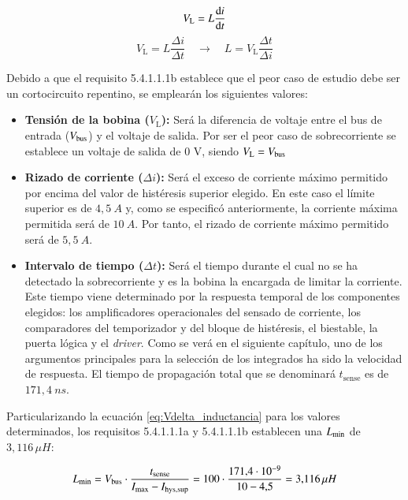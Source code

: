 \documentclass[12pt]{report} %
\begin{document}
\begin{equation}
    \label{eq:Vderivada_inductancia}
   V_\text{L} = L \dv{i}{t}
\end{equation}
\begin{equation}
    V_\text{L} = L \frac{\Delta i}{\Delta t} \quad \longrightarrow \quad L = V_\text{L}\frac{\Delta t}{\Delta i}
    \label{eq:Vdelta_inductancia}
\end{equation}

Debido a que el requisito 5.4.1.1.1b establece que el peor caso de estudio debe ser un cortocircuito repentino, se emplearán los siguientes valores:

\begin{itemize}
    \item \textbf{Tensión de la bobina ($V_\text{L}$):} Será la diferencia de voltaje entre el bus de entrada ($V_{\text{bus}}$) y el voltaje de salida. Por ser el peor caso de sobrecorriente se establece un voltaje de salida de 0 V, siendo $V_\text{L} = V_{\text{bus}}$
    \item \textbf{Rizado de corriente ($\Delta i$):} Será el exceso de corriente máximo permitido por encima del valor de histéresis superior elegido. En este caso el límite superior es de $4{,}5~A$ y, como se especificó anteriormente, la corriente máxima permitida será de $10~A$. Por tanto, el rizado de corriente máximo permitido será de $5{,}5~A$. 
    \item \textbf{Intervalo de tiempo ($\Delta t$):} Será el tiempo durante el cual no se ha detectado la sobrecorriente y es la bobina la encargada de limitar la corriente. Este tiempo viene determinado por la respuesta temporal de los componentes elegidos: los amplificadores operacionales del sensado de corriente, los comparadores del temporizador y del bloque de histéresis, el biestable, la puerta lógica y el \textit{driver}. Como se verá en el siguiente capítulo, uno de los argumentos principales para la selección de los integrados ha sido la velocidad de respuesta. El tiempo de propagación total que se denominará $t_\text{sense}$ es de $171{,}4~ns$.
\end{itemize}

Particularizando la ecuación \ref{eq:Vdelta_inductancia} para los valores determinados, los requisitos 5.4.1.1.1a y 5.4.1.1.1b establecen una $L_{\text{min}}$ de $3{,}116\,\mu H$:

\begin{equation}
    L_{\text{min}} = V_{\text{bus}}\cdot\frac{t_\text{sense}}{I_{\text{max}} - I_{\text{hys,sup}}}= 100\cdot\frac{171{,}4\cdot 10^{-9}}{10-4{,}5}=3{,}116 \, \mu H
    \label{eq:particularizacionImax}
\end{equation}
\end{document}
